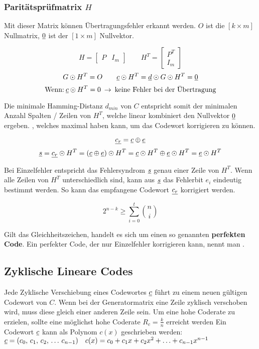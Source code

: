 \documentclass[a4paper]{article}
\begin{document}
\begin{twocolumn}
\subsubsection{Paritätsprüfmatrix $H$}
Mit dieser Matrix können Übertragungsfehler erkannt werden. $O$ ist die $[k \times m]$ 
Nullmatrix, $\underline{0}$ ist der $[1 \times m]$ Nullvektor. 

$$H = \left[ \begin{array}{ll} P & I_m \end{array} \right] \qquad H^T = 
\left[ \begin{array}{l} P^T \\ I_m \end{array} \right]$$
$$G \odot H^T = O \qquad \underline{c} \odot H^T = \underline{d} \odot G \odot H^T = \underline{0}$$
$$\text{Wenn:} \: \underline{c} \odot H^T = 0 \: \rightarrow \: \text{keine Fehler bei der Übertragung}$$

Die minimale Hamming-Distanz $d_{min}$ von $C$ entspricht somit der minimalen Anzahl
Spalten / Zeilen von $H^T$, welche linear kombiniert den Nullvektor $\underline{0}$ ergeben. 
, welches maximal  haben kann, um das Codewort korrigieren zu können.

$$\underline{c_r} = \underline{c} \oplus \underline{e}$$ 
$$\underline{s} = \underline{c_r} \odot H^T = (\underline{c} \oplus \underline{e}) \odot H^T = \underline{c} \odot H^T \oplus \underline{e} \odot H^T = \underline{e} \odot H^T$$

Bei Einzelfehler entspricht das Fehlersyndrom $\underline{s}$ genau einer Zeile von $H^T$. 
Wenn alle Zeilen von $H^T$ unterschiedlich sind, kann aus $\underline{s}$ das Fehlerbit $e_i$ eindeutig bestimmt werden.
So kann das empfangene Codewort $\underline{c_r}$ korrigiert werden. 

$$2^{n-k} \geq \sum_{i=0}^t \binom{n}{i}$$

Gilt das Gleichheitszeichen, handelt es sich um einen so genannten \textbf{perfekten Code}. 
Ein perfekter Code, der nur Einzelfehler korrigieren kann, nennt man .

\subsection{Zyklische Lineare Codes}
Jede Zyklische Verschiebung eines Codewortes $\underline{c}$ führt zu einem neuen gültigen Codewort von $C$.
Wenn bei der Generatormatrix eine Zeile zyklisch verschoben wird, muss diese gleich einer anderen Zeile sein.
Um eine hohe Coderate zu erzielen, sollte eine möglichst hohe Coderate $R_c = \frac{k}{n}$ erreicht werden
Ein Codewort $\underline{c}$ kann als Polynom $c(x)$ geschrieben werden:
$\underline{c} = (c_0, \, c_1, \, c_2, \, \ldots \, c_{n-1}) \quad c(x) = c_0 + c_1 x + c_2 x^2 + \ldots + c_{n-1} x^{n-1}$


\end{twocolumn}
\end{document}
